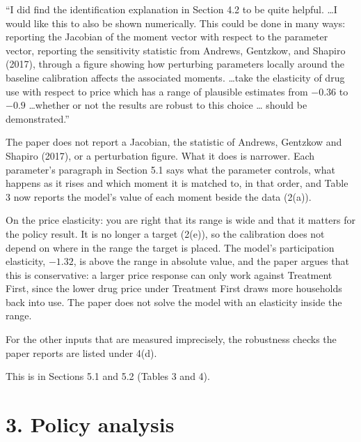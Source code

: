 \documentclass[11pt]{article}
\begin{document}
\begin{referee}
``I did find the identification explanation in Section 4.2 to be quite helpful.
\dots I would like this to also be shown numerically. This could be done in many
ways: reporting the Jacobian of the moment vector with respect to the parameter
vector, reporting the sensitivity statistic from Andrews, Gentzkow, and Shapiro
(2017), through a figure showing how perturbing parameters locally around the
baseline calibration affects the associated moments. \dots take the elasticity of
drug use with respect to price which has a range of plausible estimates from
$-0.36$ to $-0.9$ \dots whether or not the results are robust to this choice \dots
should be demonstrated.''
\end{referee}
\begin{response}
\open The paper does not report a Jacobian, the statistic of Andrews, Gentzkow and
Shapiro (2017), or a perturbation figure. What it does is narrower. Each
parameter's paragraph in Section 5.1 says what the parameter controls, what
happens as it rises and which moment it is matched to, in that order, and Table 3
now reports the model's value of each moment beside the data (2(a)).

On the price elasticity: you are right that its range is wide and that it matters
for the policy result. It is no longer a target (2(e)), so the calibration does
not depend on where in the range the target is placed. The model's participation
elasticity, $-1.32$, is above the range in absolute value, and the paper argues
that this is conservative: a larger price response can only work against
Treatment First, since the lower drug price under Treatment First draws more
households back into use. The paper does not solve the model with an elasticity
inside the range.

For the other inputs that are measured imprecisely, the robustness checks the
paper reports are listed under 4(d).

This is in Sections 5.1 and 5.2 (Tables 3 and 4).
\end{response}

\section*{3. Policy analysis}
\end{document}
